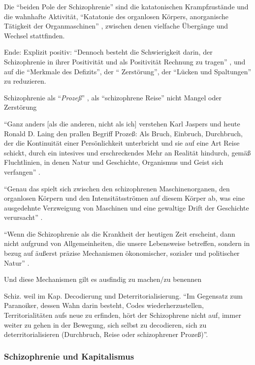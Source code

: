 \documentclass[12pt,
               DIV13,
               paper=a4,
               twoside=false,
               onehalfspacing,
               bibliography=totoc,
               toc=graduated,
               draft,
               ]{scrartcl}
\newcommand{\pc}[2]{\parencite[#1]{#2}}
\newcommand{\worries}[1]{\ifdraft{\textcolor{blue}{\texttt{(#1)}}}{}}
\begin{document}
Die "`beiden Pole der Schizophrenie"' \pc{21}{schizg} sind die
katatonischen Krampfzustände und die wahnhafte Aktivität, "`Katatonie
des organlosen Körpers, anorganische Tätigkeit der Organmaschinen"'
\pc{21}{schizg}, zwischen denen vielfache Übergänge und Wechsel
stattfinden.

Ende: Explizit positiv: "`Dennoch besteht die Schwierigkeit darin, der
Schizophrenie in ihrer Positivität und als Positivität Rechnung zu
tragen"' \pc{24}{schizg}, und auf die "`Merkmale des Defizits"', der "`
Zerstörung"', der "`Lücken und Spaltungen"' \pc{24}{schizg} zu
reduzieren.

Schizophrenie als "`\emph{Prozeß}"' \pc{27}{schizg}, als
"`schizophrene Reise"' \pc{22}{schizg} nicht Mangel oder Zerstörung

"`Ganz anders [als die anderen, nicht als ich] verstehen Karl Jaspers
und heute Ronald D. Laing den prallen Begriff \glq Prozeß\grq: Als
Bruch, Einbruch, Durchbruch, der die Kontinuität einer Persönlichkeit
unterbricht und sie auf eine Art Reise schickt, durch ein intesives
und erschreckendes \glq Mehr an Realität\grq{} hindurch, gemäß
Fluchtlinien, in denen Natur und Geschichte, Organismus und Geist sich
verfangen"' \pc{28}{schizg}. \worries{aber bei denen doch auch ein Problem?}

"`Genau das spielt sich zwischen den schizophrenen Maschinenorganen,
den organlosen Körpern und den Intensitätsströmen auf diesem Körper
ab, was eine ausgedehnte Verzweigung von Maschinen und eine gewaltige
Drift der Geschichte verursacht"' \pc{28}{schizg}.

"`Wenn die Schizophrenie als die Krankheit der heutigen Zeit
erscheint, dann nicht aufgrund von Allgemeinheiten, die unsere
Lebensweise betreffen, sondern in bezug auf äußerst präzise
Mechanismen ökonomischer, sozialer und politischer Natur"' \pc{28}{schizg}.

Und diese Mechanismen gilt es ausfindig zu machen/zu benennen

Schiz. weil im Kap. Decodierung und Deterritorialisierung. "`Im
Gegensatz zum Paranoiker, dessen Wahn darin besteht, Codes
wiederherzustellen, Territorialitäten aufs neue zu erfinden, hört der
Schizophrene nicht auf, immer weiter zu gehen in der Bewegung, sich
selbst zu decodieren, sich zu deterritorialisieren (Durchbruch, Reise
oder schizophrener Prozeß)"'\pc{28}{schizg}.

\subsubsection{Schizophrenie und Kapitalismus}
\end{document}
